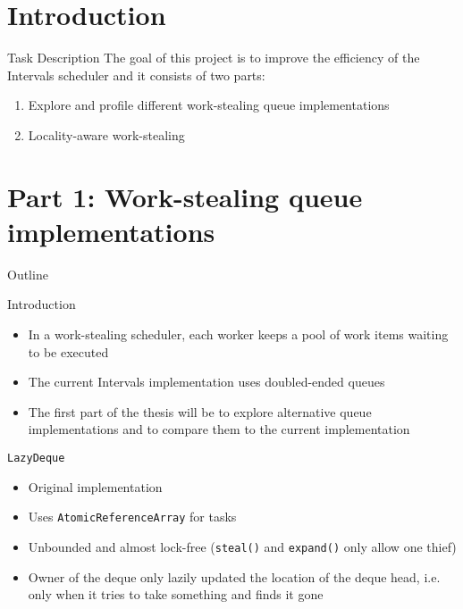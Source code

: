 \section*{Introduction}


\begin{frame}{Task Description}
  The goal of this project is to improve the efficiency of the
  Intervals scheduler and it consists of two parts:


  \begin{enumerate}
  \item Explore and profile different work-stealing queue
    implementations
  \item Locality-aware work-stealing
  \end{enumerate}
\end{frame}


\section{Part 1: Work-stealing queue implementations}

\begin{frame}{Outline}
  \tableofcontents[current]
\end{frame}

\begin{frame}{Introduction}
  \begin{itemize}
  \item In a work-stealing scheduler, each worker keeps a pool of work
    items waiting to be executed
  \item The current Intervals implementation uses doubled-ended queues
  \item The first part of the thesis will be to explore alternative
    queue implementations and to compare them to the current
    implementation
  \end{itemize}
\end{frame}

\begin{frame}{\lstinline!LazyDeque!}
  \begin{itemize}
  \item Original implementation
  \item Uses \lstinline!AtomicReferenceArray! for tasks
  \item Unbounded and almost lock-free (\lstinline!steal()! and
    \lstinline!expand()! only allow one thief)
  \item Owner of the deque only lazily updated the location of the
    deque head, i.e. only when it tries to take something and finds it
    gone
  \end{itemize}
\end{frame}

